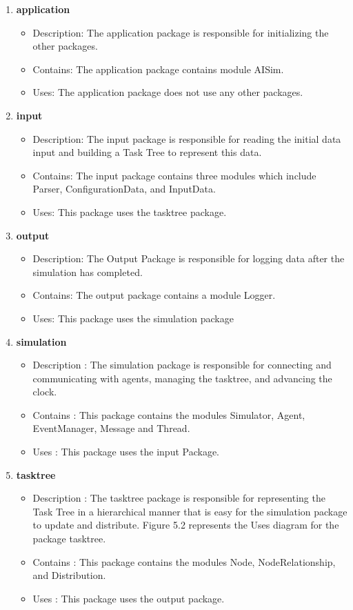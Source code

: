 \begin{enumerate}

\item\textbf{application}
\begin{itemize}
\item Description: The application package is responsible for initializing the other packages. 
\item Contains: The application package contains module AISim.
\item Uses: The application package does not use any other packages.
\end{itemize}

\item\textbf{input}
\begin{itemize}
\item Description: The input package is responsible for reading the initial data input and building a Task Tree to represent this data.
\item Contains: The input package contains three modules which include Parser, ConfigurationData, and InputData.
\item Uses: This package uses the tasktree package.
\end{itemize}

\item\textbf{output}
\begin{itemize}
\item Description: The Output Package is responsible for logging data after the simulation has completed.
\item Contains: The output package contains a module Logger.
\item Uses: This package uses the simulation package
\end{itemize}

\item\textbf{simulation}
\begin{itemize}
\item Description : The simulation package is responsible for connecting and communicating with agents, managing the tasktree, and advancing the clock.
\item Contains : This package contains the modules Simulator, Agent, EventManager, Message and Thread.
\item Uses : This package uses the input Package.
\end{itemize}

\item\textbf{tasktree}
\begin{itemize}
\item Description : The tasktree package is responsible for representing the Task Tree in a hierarchical manner that is easy for the simulation package to update and distribute. Figure 5.2 represents the Uses diagram for the package tasktree.
\item Contains : This package contains the modules Node, NodeRelationship, and Distribution.
\item Uses : This package uses the output package.


\end{itemize}
\end{enumerate}
